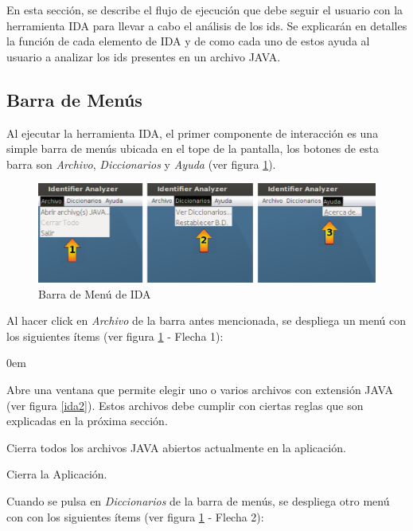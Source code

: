 \documentclass[a4paper,12pt]{report}
\begin{document}
En esta sección, se describe el flujo de ejecución que debe seguir el usuario con la herramienta IDA para llevar a cabo el análisis de los ids. Se explicarán en detalles la función de cada elemento de IDA y de como cada uno de estos ayuda al usuario a analizar los ids presentes en un archivo JAVA.

\subsection{Barra de Menús}

Al ejecutar la herramienta IDA, el primer componente de interacción es una simple barra de menús ubicada en el tope de la pantalla, los botones de esta barra son \textit{Archivo}, \textit{Diccionarios} y \textit{Ayuda} (ver figura \ref{ida1}). 

\begin{figure}[t] %
\centerline{%
\includegraphics[scale= 0.46]{./ida_01.png}
}
\caption{Barra de Menú de IDA}
\label{ida1}
\end{figure}

Al hacer click en \textit{Archivo} de la barra antes mencionada, se despliega un menú con los siguientes ítems (ver figura \ref{ida1} - Flecha 1):

\begin{description}
\itemsep0em%
\item[Abrir archivo(s) JAVA:] Abre una ventana que permite elegir uno o varios archivos con extensión JAVA (ver figura \ref{ida2}). Estos archivos debe cumplir con ciertas reglas que son explicadas en la próxima sección.
\item[Cerrar Todo:] Cierra todos los archivos JAVA abiertos actualmente en la aplicación.
\item[Salir:] Cierra la Aplicación.
\end{description}

Cuando se pulsa en \textit{Diccionarios} de la barra de menús, se despliega otro menú con con los siguientes ítems (ver figura \ref{ida1} - Flecha 2):
\end{document}
